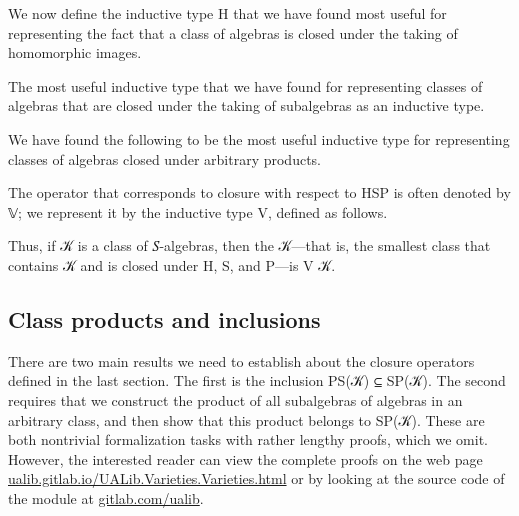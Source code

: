 \documentclass[a4paper,UKenglish,cleveref,autoref,thm-restate]{lipics-v2021}
\begin{document}
We now define the inductive type \af H that we have found most useful for representing the fact that a class of algebras is closed under the taking of homomorphic images.
\ccpad
\begin{code}%
  
\end{code}
\ccpad
The most useful inductive type that we have found for representing classes of algebras that are closed under the taking of subalgebras as an inductive type.
\ccpad
\begin{code}%
  
\end{code}
\ccpad
We have found the following to be the most useful inductive type for representing classes of algebras closed under arbitrary products.
\ccpad
\begin{code}%
  
\end{code}
\ccpad
The operator that corresponds to closure with respect to \ad H\ad S\ad P is often denoted by 𝕍; we represent it by the inductive type \ad V, defined as follows.
\ccpad
\begin{code}%
  
\end{code}
\ccpad
Thus, if \ab 𝒦 is a class of \ab 𝑆-algebras, then the  \ab 𝒦---that is, the smallest class that contains \ab 𝒦 and is closed under \ad H, \ad S, and \ad P---is \ad V \ab 𝒦.




\subsection{Class products and inclusions}\label{ssec:class-products-and-inclusions}
There are two main results we need to establish about the closure operators defined in the last section.  The first is the inclusion \ad P\ad S(\ab 𝒦) ⊆ \ad S\ad P(\ab 𝒦). The second requires that we construct the product of all subalgebras of algebras in an arbitrary class, and then show that this product belongs to \ad S\ad P(\ab 𝒦).  These are both nontrivial formalization tasks with rather lengthy proofs, which we omit.  However, the interested reader can view the complete proofs on the web page \href{https://ualib.gitlab.io/UALib.Varieties.Varieties.html}{ualib.gitlab.io/UALib.Varieties.Varieties.html} or by looking at the source code of the \ualibVarieties module at \href{https://gitlab.com/ualib/ualib.gitlab.io/-/blob/master/UALib/Varieties/Varieties.lagda}{gitlab.com/ualib}.
\end{document}
